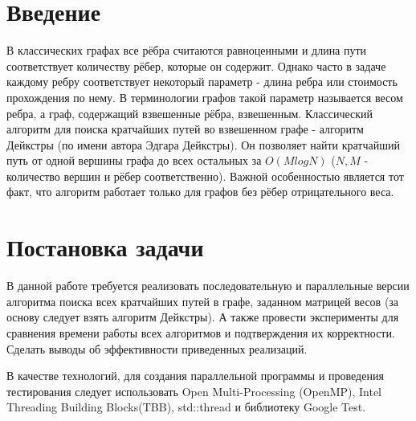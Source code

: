 \documentclass{report}
\begin{document}
\setcounter{page}{2}

\tableofcontents
\newpage

\section*{Введение}
\par В классических графах все рёбра считаются равноценными и длина пути соответствует количеству рёбер, которые он содержит. Однако часто в задаче каждому ребру соответствует некоторый параметр - длина ребра или стоимость прохождения по нему. В терминологии графов такой параметр называется весом ребра, а граф, содержащий взвешенные рёбра, взвешенным. Классический алгоритм для поиска кратчайших путей во взвешенном графе - алгоритм Дейкстры (по имени автора Эдгара Дейкстры). Он позволяет найти кратчайший путь от одной вершины графа до всех остальных за $O(MlogN)$ ($N,M$ - количество вершин и рёбер соответственно). Важной особенностью является тот факт, что алгоритм работает только для графов без рёбер отрицательного веса.
\newpage

\section*{Постановка задачи}
\par В данной работе требуется реализовать последовательную и параллельные версии алгоритма поиска всех кратчайших путей в графе, заданном матрицей весов (за основу следует взять алгоритм Дейкстры). А также провести эксперименты для сравнения времени работы всех алгоритмов и подтверждения их корректности. Сделать выводы об эффективности приведенных реализаций.
\par В качестве технологий, для создания параллельной программы и проведения тестирования следует использовать Open Multi-Processing (OpenMP), Intel Threading Building Blocks(TBB), std::thread и библиотеку Google Test.
\newpage

\end{document}
